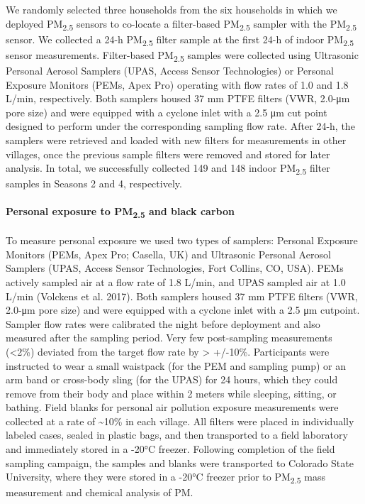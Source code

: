 \documentclass[
  letterpaper,
  DIV=11,
  numbers=noendperiod]{scrartcl}
\let\oldparagraph\paragraph
\renewcommand{\paragraph}[1]{\oldparagraph{#1}\mbox{}}
\begin{document}
We randomly selected three households from the six households in which
we deployed PM\textsubscript{2.5} sensors to co-locate a filter-based
PM\textsubscript{2.5} sampler with the PM\textsubscript{2.5} sensor. We
collected a 24-h PM\textsubscript{2.5} filter sample at the first 24-h
of indoor PM\textsubscript{2.5} sensor measurements. Filter-based
PM\textsubscript{2.5} samples were collected using Ultrasonic Personal
Aerosol Samplers (UPAS, Access Sensor Technologies) or Personal Exposure
Monitors (PEMs, Apex Pro) operating with flow rates of 1.0 and 1.8
L/min, respectively. Both samplers housed 37 mm PTFE filters (VWR,
2.0-μm pore size) and were equipped with a cyclone inlet with a 2.5 μm
cut point designed to perform under the corresponding sampling flow
rate. After 24-h, the samplers were retrieved and loaded with new
filters for measurements in other villages, once the previous sample
filters were removed and stored for later analysis. In total, we
successfully collected 149 and 148 indoor PM\textsubscript{2.5} filter
samples in Seasons 2 and 4, respectively.

\hypertarget{personal-exposure-to-pm2.5-and-black-carbon}{%
\paragraph{\texorpdfstring{Personal exposure to PM\textsubscript{2.5}
and black
carbon}{Personal exposure to PM2.5 and black carbon}}\label{personal-exposure-to-pm2.5-and-black-carbon}}

To measure personal exposure we used two types of samplers: Personal
Exposure Monitors (PEMs, Apex Pro; Casella, UK) and Ultrasonic Personal
Aerosol Samplers (UPAS, Access Sensor Technologies, Fort Collins, CO,
USA). PEMs actively sampled air at a flow rate of 1.8 L/min, and UPAS
sampled air at 1.0 L/min (Volckens et al. 2017). Both samplers housed 37
mm PTFE filters (VWR, 2.0-μm pore size) and were equipped with a cyclone
inlet with a 2.5 μm cutpoint. Sampler flow rates were calibrated the
night before deployment and also measured after the sampling period.
Very few post-sampling measurements (\textless2\%) deviated from the
target flow rate by \textgreater{} +/-10\%. Participants were instructed
to wear a small waistpack (for the PEM and sampling pump) or an arm band
or cross-body sling (for the UPAS) for 24 hours, which they could remove
from their body and place within 2 meters while sleeping, sitting, or
bathing. Field blanks for personal air pollution exposure measurements
were collected at a rate of \textasciitilde10\% in each village. All
filters were placed in individually labeled cases, sealed in plastic
bags, and then transported to a field laboratory and immediately stored
in a -20°C freezer. Following completion of the field sampling campaign,
the samples and blanks were transported to Colorado State University,
where they were stored in a -20°C freezer prior to PM\textsubscript{2.5}
mass measurement and chemical analysis of PM.
\end{document}
